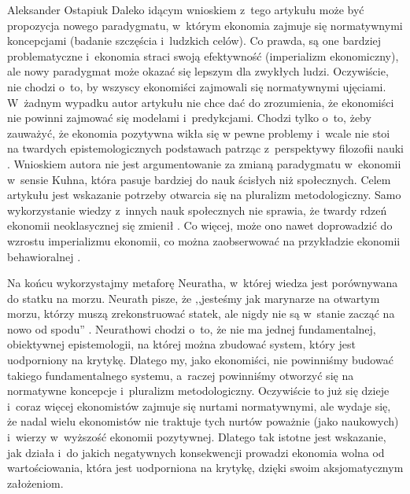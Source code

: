 \begin{artplenv}{Aleksander Ostapiuk}
Daleko idącym wnioskiem z~tego artykułu może być propozycja nowego paradygmatu, w~którym ekonomia zajmuje się
normatywnymi koncepcjami (badanie szczęścia i~ludzkich celów). Co prawda, są one bardziej
problematyczne i~ekonomia straci swoją efektywność (imperializm ekonomiczny), ale nowy paradygmat może okazać
się lepszym dla zwykłych
ludzi. Oczywiście, nie chodzi o~to, by wszyscy ekonomiści zajmowali się normatywnymi ujęciami. W~żadnym wypadku autor
artykułu nie chce dać do zrozumienia, że ekonomiści nie powinni zajmować się modelami i~predykcjami. Chodzi tylko o~to,
żeby zauważyć, że ekonomia pozytywna wikła się w pewne problemy i~wcale nie stoi na twardych epistemologicznych
podstawach patrząc z~perspektywy filozofii nauki
\parencite{kuhn_structure_1962,feyerabend_against_1975,lakatos_methodology_1980,caldwell_beyond_1982,mccloskey_rhetoric_1998,hands_reflection_2001}.
Wnioskiem autora nie jest argumentowanie za zmianą
paradygmatu w~ekonomii w~sensie Kuhna, która pasuje bardziej do nauk ścisłych niż społecznych.
Celem artykułu jest wskazanie potrzeby
otwarcia się na pluralizm metodologiczny. Samo wykorzystanie wiedzy z~innych nauk społecznych nie sprawia, że twardy
rdzeń ekonomii neoklasycznej się zmienił
\parencite[zob.][]{dow_foundations_2012}.
Co więcej, może ono nawet
doprowadzić do wzrostu imperializmu ekonomii, co można zaobserwować na przykładzie ekonomii behawioralnej
\parencite{berg_as-if_2010}.

Na końcu wykorzystajmy metaforę Neuratha, w~której wiedza jest porównywana do statku na morzu. Neurath pisze, że
,,jesteśmy jak marynarze na otwartym morzu, którzy muszą zrekonstruować statek, ale nigdy nie są w~stanie zacząć na nowo
od spodu''
\parencite[s.~199]{neurath_anti-spengler_1973}.
Neurathowi chodzi o~to, że nie ma jednej fundamentalnej,
obiektywnej epistemologii, na której można zbudować system, który jest uodporniony na krytykę. Dlatego my, jako
ekonomiści, nie powinniśmy budować takiego fundamentalnego systemu, a~raczej powinniśmy otworzyć się na normatywne
koncepcje i~pluralizm metodologiczny. Oczywiście to już się dzieje i~coraz więcej ekonomistów zajmuje się nurtami
normatywnymi, ale wydaje się, że nadal wielu ekonomistów nie traktuje tych nurtów poważnie
(jako naukowych) i~wierzy w~wyższość ekonomii pozytywnej.
Dlatego tak istotne jest wskazanie, jak działa i~do jakich negatywnych konsekwencji
prowadzi ekonomia wolna od wartościowania, która jest uodporniona na krytykę, dzięki swoim aksjomatycznym założeniom. 

\end{artplenv}\label{ost-stop}